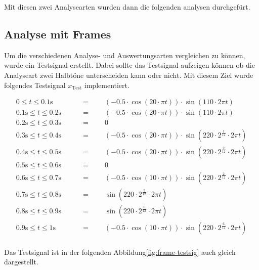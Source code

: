 Mit diesen zwei Analysearten wurden dann die folgenden analysen durchgefürt.
\newpage

\subsection{Analyse mit Frames}

Um die verschiedenen Analyse- und Auswertungsarten vergleichen zu können, wurde ein Testsignal erstellt. Dabei sollte das Testsignal aufzeigen können ob die Analyseart zwei Halbtöne unterscheiden kann oder nicht. Mit diesem Ziel wurde folgendes Testsignal $x_{\text{Test}}$ implementiert.

\begin{loesung}
	\begin{align*}
	0 \leq t \leq 0.1\text{s} \qquad			& = \qquad (-0.5\cdot \cos(20\cdot\pi t))\cdot \sin(110\cdot 2\pi t) \\
	0.1\text{s} \leq t \leq 0.2\text{s}\qquad	& = \qquad (-0.5\cdot \cos(20\cdot\pi t))\cdot \sin(110\cdot 2\pi t) \\
	0.2\text{s} \leq t \leq 0.3\text{s}\qquad	& = \qquad 0\\
	0.3\text{s} \leq t \leq 0.4\text{s}\qquad	& = \qquad (-0.5\cdot \cos(20\cdot\pi t))\cdot \sin(220\cdot  2^{\frac{1}{12}}\cdot 2\pi t) \\
	0.4\text{s} \leq t \leq 0.5\text{s}\qquad	& = \qquad (-0.5\cdot \cos(20\cdot\pi t))\cdot \sin(220\cdot2^{\frac{2}{12}}\cdot 2\pi t) \\
	0.5\text{s} \leq t \leq 0.6\text{s}\qquad	& = \qquad 0 \\
	0.6\text{s} \leq t \leq 0.7\text{s}\qquad	& = \qquad (-0.5\cdot \cos(10\cdot\pi t))\cdot \sin(220\cdot2^{\frac{2}{12}}\cdot 2\pi t) \\
	0.7\text{s} \leq t \leq 0.8\text{s}\qquad	& = \qquad \sin(220\cdot2^{\frac{5}{12}}\cdot 2\pi t) \\
	0.8\text{s} \leq t \leq 0.9\text{s}\qquad	& = \qquad \sin(220\cdot2^{\frac{6}{12}}\cdot 2\pi t) \\
	0.9\text{s} \leq t \leq 1\text{s}\qquad		& = \qquad (-0.5\cdot \cos(10\cdot\pi t))\cdot \sin(220\cdot2^{\frac{6}{12}}\cdot 2\pi t) \\
	\end{align*}
\end{loesung}
Das Testsignal ist in der folgenden Abbildung\ref{fig:frame-testsig} auch gleich dargestellt.

